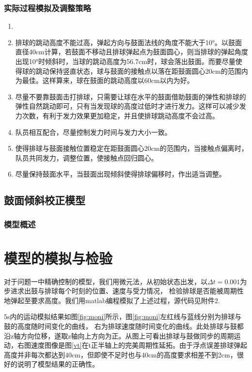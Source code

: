 \documentclass[withoutpreface,bwprint]{cumcmthesis} %
\begin{document}
\subsubsection{实际过程模拟及调整策略}
\begin{enumerate}
\item
\item 排球的跳动高度不能过高，弹起方向与鼓面法线的角度不能大于10°。以鼓面直径40cm计算，若鼓面不移动且排球弹起点为鼓面圆心，则当排球的弹起角度出现10°时倾斜时，当球的跳动高度为56.7cm时，球会落出鼓面。而要尽量使得球的跳动保持竖直状态，球与鼓面的接触点以落在距鼓面圆心20cm的范围内为最佳。这样算来，球在鼓面的跳动高度以60cm以内为好。
\item 尽量不要靠鼓面击打排球，只需要让球在水平的鼓面借助鼓面的弹性和排球的弹性自然跳动即可，只有当发现球的高度过低时才进行发力。这样可以减少发力次数，有利于发力效果更加稳定，并且使排球跳动高度不会过高。
\item 队员相互配合，尽量控制发力时间与发力大小一致。
\item 使得排球与鼓面接触位置稳定在距鼓面圆心20cm的范围内，当接触点偏离时，队员共同发力，调整位置，使接触点回归圆心。
\item 尽量保持鼓面水平，当鼓面出现倾斜使得排球偏移时，作出适当调整。
\end{enumerate}

\subsection{鼓面倾斜校正模型}
\subsubsection{模型概述}


\section{模型的模拟与检验}

对于问题一中精确控制的模型，我们用微元法，从初始状态出发，以$\Delta t=0.001$为步进求出鼓与排球每个时刻的位置、速度与受力情况，
检验排球是否能被周期性地弹起至要求高度。我们用matlab编程模拟了上述过程，源代码见附件2.

5s内的运动模拟结果如图\ref{fig:moni}所示，图\ref{fig:moni}左红线与蓝线分别为排球与鼓的高度随时间变化的曲线，
右为排球速度随时间变化的曲线。此处排球与鼓都沿z轴方向位移，遂取z轴向上方向为正。从图上可看出排球与鼓做同步的周期运动，右图速度图像是图\ref{vt}在t正半轴上的完美周期性延拓。由于浮点误差排球弹起高度并非每次都达到40cm，但即使不足时也与40cm的高度要求相差不到2cm，很好的说明了模型结果的正确性。
\end{document}
